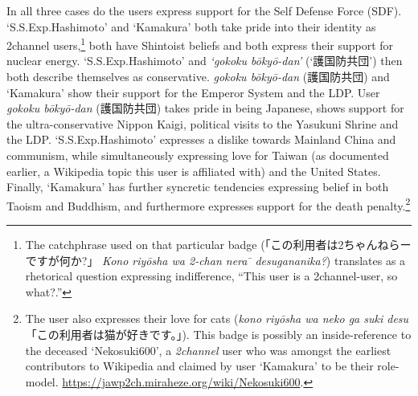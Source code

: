 \documentclass[10pt,british,A4paper,,openany]{memoir}
\begin{document}
In all three cases do the users express support for the Self Defense
Force (SDF). `S.S.Exp.Hashimoto' and `Kamakura' both take pride into
their identity as 2channel users,\footnote{The catchphrase used on that
  particular badge (「この利用者は2ちゃんねらーですが何か?」 \emph{Kono
  riyōsha wa 2-chan nera ̄ desugananika?}) translates as a rhetorical
  question expressing indifference, ``This user is a 2channel-user, so
  what?.''} both have Shintoist beliefs and both express their support
for nuclear energy. `S.S.Exp.Hashimoto' and \emph{`gokoku bōkyō-dan'}
(`護国防共団') then both describe themselves as conservative.
\emph{gokoku bōkyō-dan} (護国防共団) and `Kamakura' show their support
for the Emperor System and the LDP. User \emph{gokoku bōkyō-dan}
(護国防共団) takes pride in being Japanese, shows support for the
ultra-conservative Nippon Kaigi, political visits to the Yasukuni Shrine
and the LDP. `S.S.Exp.Hashimoto' expresses a dislike towards Mainland
China and communism, while simultaneously expressing love for Taiwan (as
documented earlier, a Wikipedia topic this user is affiliated with) and
the United States. Finally, `Kamakura' has further syncretic tendencies
expressing belief in both Taoism and Buddhism, and furthermore expresses
support for the death penalty.\footnote{The user also expresses their
  love for cats (\emph{kono riyōsha wa neko ga suki desu}
  「この利用者は猫が好きです。」). This badge is possibly an
  inside-reference to the deceased `Nekosuki600', a \emph{2channel} user
  who was amongst the earliest contributors to Wikipedia and claimed by
  user `Kamakura' to be their role-model.
  \url{https://jawp2ch.miraheze.org/wiki/Nekosuki600}.}
\end{document}
